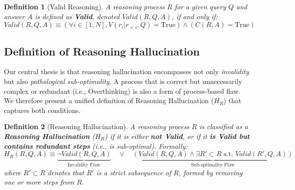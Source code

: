 \newtheorem{definition}{Definition}
\begin{definition}[Valid Reasoning]
    \label{def:valid_reasoning}
    A reasoning process $R$ for a given query $Q$ and answer $A$ is defined as \textbf{Valid}, denoted $Valid(R, Q, A)$, if and only if:
    $$
        Valid(R, Q, A) \equiv \left( \forall i \in [1, N], V(r_i | r_{<i}, Q) = \text{True} \right) \land \left( C(R, A) = \text{True} \right)
    $$
\end{definition}

\subsection{Definition of Reasoning Hallucination}

Our central thesis is that reasoning hallucination encompasses not only \textit{invalidity} but also \textit{pathological sub-optimality}. A process that is correct but unnecessarily complex or redundant (i.e., Overthinking) is also a form of process-based flaw. We therefore present a unified definition of Reasoning Hallucination ($H_R$) that captures both conditions.

\begin{definition}[Reasoning Hallucination]
    \label{def:reasoning_hallucination}
    A reasoning process $R$ is classified as a \textbf{Reasoning Hallucination} ($H_R$) if it is either \textbf{not Valid}, or if it \textbf{is Valid but contains redundant steps} (i.e., is sub-optimal). Formally:
    $$
        H_R(R, Q, A) \equiv \underbrace{\neg Valid(R, Q, A)}_{\text{Invalidity Flaw}} \quad \lor \quad \underbrace{\left( Valid(R, Q, A) \land \exists R' \subset R \text{ s.t. } Valid(R', Q, A) \right)}_{\text{Sub-optimality Flaw}}
    $$
    where $R' \subset R$ denotes that $R'$ is a strict subsequence of $R$, formed by removing one or more steps from $R$.
\end{definition}
